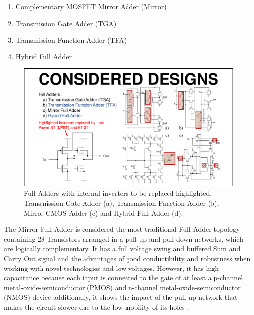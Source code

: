 \documentclass[diss,pgmicro,english]{iiufrgs}
\begin{document}
\begin{enumerate}
    \item Complementary MOSFET Mirror  Adder (Mirror)
    \item Transmission Gate Adder (TGA)
    \item Transmission Function Adder (TFA)
    \item Hybrid Full Adder
\end{enumerate}

\begin{figure}[ht]
\centering
\includegraphics[width=1\textwidth,trim={15.5cm 0cm 2cm 3cm},clip]{FAs.pdf}
\caption{Full Adders with internal inverters to be replaced highlighted. Transmission Gate Adder (a), Transmission Function Adder (b), Mirror CMOS Adder (c) and Hybrid Full Adder (d).}
\label{fig:FAs}
\end{figure}

The Mirror Full Adder is considered the most traditional Full Adder topology containing 28 Transistors arranged in a pull-up and pull-down networks, which are logically complementary. It has a full voltage swing and buffered Sum and Carry Out signal and the advantages of good conductibility and robustness when working with novel technologies and low voltages. However, it has high capacitance because each input is connected to the gate of at least a p-channel metal-oxide-semiconductor (PMOS) and n-channel metal-oxide-semiconductor (NMOS) device additionally, it shows the impact of the pull-up network that makes the circuit slower due to the low mobility of its holes \cite{beckett2002fine} \cite{devadas2017design} \cite{islam2011design}.
\end{document}
